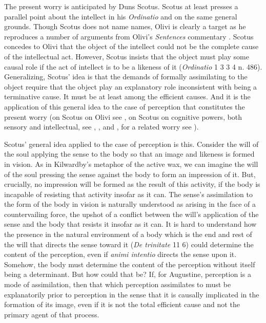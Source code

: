 \documentclass[12pt]{article}
\begin{document}
The present worry is anticipated by Duns Scotus. Scotus at least presses a parallel point about the intellect in his \emph{Ordinatio} and on the same general grounds. Though Scotus does not name names, Olivi is clearly a target as he reproduces a number of arguments from Olivi's \emph{Sentences} commentary \citep[148]{Pasnau:1997aa}. Scotus concedes to Olivi that the object of the intellect could not be the complete cause of the intellectual act. However, Scotus insists that the object must play some causal role if the act of intellect is to be a likeness of it (\emph{Ordinatio} 1 3 3 4 n. 486). Generalizing, Scotus' idea is that the demands of formally assimilating to the object require that the object play an explanatory role inconsistent with being a terminative cause. It must be at least among the efficient causes. And it is the application of this general idea to the case of perception that constitutes the present worry (on Scotus on Olivi see \citealt[chapter 4.4]{Pasnau:1997aa}, on Scotus on cognitive powers, both sensory and intellectual, see \citealt[chapter 3]{Tachau:1988aa}, \citealt[257--266]{Spruit:1994qq}, and \citealt{Cross:2014aa}, for a related worry see \citealt[174--175]{Pasnau:1997aa}). 

Scotus' general idea applied to the case of perception is this. Consider the will of the soul applying the sense to the body so that an image and likeness is formed in vision. As in Kilwardby's metaphor of the active wax, we can imagine the will of the soul pressing the sense against the body to form an impression of it. But, crucially, no impression will be formed as the result of this activity, if the body is incapable of resisting that activity insofar as it can. The sense's assimilation to the form of the body in vision is naturally understood as arising in the face of a countervailing force, the upshot of a conflict between the will's application of the sense and the body that resists it insofar as it can. It is hard to understand how the presence in the natural environment of a body which is the end and rest of the will that directs the sense toward it (\emph{De trinitate} 11 6) could determine the content of the perception, even if \emph{animi intentio} directs the sense upon it. Somehow, the body must determine the content of the perception without itself being a determinant. But how could that be? If, for Augustine, perception is a mode of assimilation, then that which perception assimilates to must be explanatorily prior to perception in the sense that it is causally implicated in the formation of its image, even if it is not the total efficient cause and not the primary agent of that process.
\end{document}
